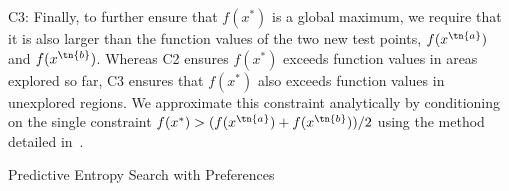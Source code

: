 C3: Finally, to further ensure that $f(x^*)$ is a global maximum, we require
that it is also larger than the function values of the two new test points,
$f(x^\tn{a})$ and $f(x^\tn{b})$. Whereas C2 ensures $f(x^*)$ exceeds function
values in areas explored so far, C3 ensures that $f(x^*)$ also exceeds function
values in unexplored regions. We approximate this constraint analytically by
conditioning on the single constraint $f(x^*) > (f(x^\tn{a}) + f(x^\tn{b}))/2$
using the method detailed in~\citep{xu2010estimation}.
\begin{algorithm}[t]
    \caption{Predictive Entropy Search with Preferences}
    \begin{algorithmic}[1]
            \EndFor{}
        \EndProcedure{}
        \Statex{}
        \EndFunction{}
    \end{algorithmic}\label{alg:pesp}
\end{algorithm}

